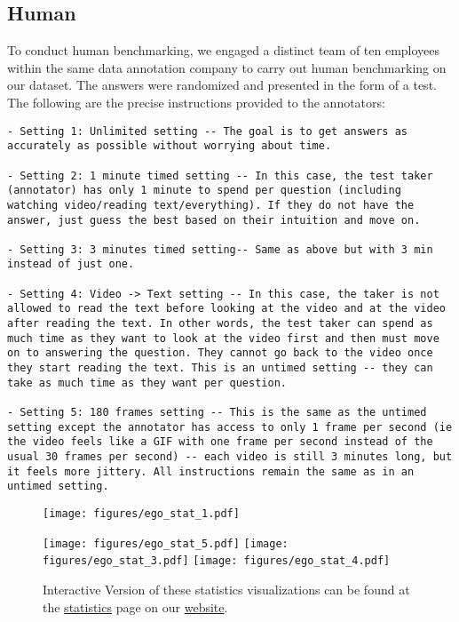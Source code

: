 \subsection{\textbf{Human}}
To conduct human benchmarking, we engaged a distinct team of ten employees within the same data annotation company to carry out human benchmarking on our dataset. The answers were randomized and presented in the form of a test. The following are the precise instructions provided to the annotators:
\begin{lstlisting}
- Setting 1: Unlimited setting -- The goal is to get answers as accurately as possible without worrying about time. 

- Setting 2: 1 minute timed setting -- In this case, the test taker (annotator) has only 1 minute to spend per question (including watching video/reading text/everything). If they do not have the answer, just guess the best based on their intuition and move on.

- Setting 3: 3 minutes timed setting-- Same as above but with 3 min instead of just one.

- Setting 4: Video -> Text setting -- In this case, the taker is not allowed to read the text before looking at the video and at the video after reading the text. In other words, the test taker can spend as much time as they want to look at the video first and then must move on to answering the question. They cannot go back to the video once they start reading the text. This is an untimed setting -- they can take as much time as they want per question. 

- Setting 5: 180 frames setting -- This is the same as the untimed setting except the annotator has access to only 1 frame per second (ie the video feels like a GIF with one frame per second instead of the usual 30 frames per second) -- each video is still 3 minutes long, but it feels more jittery. All instructions remain the same as in an untimed setting. 
\end{lstlisting}
\clearpage
\begin{figure}[h!]
\centering
\texttt{[image: figures/ego\_stat\_1.pdf]}

\texttt{[image: figures/ego\_stat\_5.pdf]}
\texttt{[image: figures/ego\_stat\_3.pdf]}
\texttt{[image: figures/ego\_stat\_4.pdf]}
\caption{Interactive Version of these statistics visualizations can be found at the \href{https://public.tableau.com/views/EgoSchema/EGOSchema?:showVizHome=no}{statistics} page on our \href{https://egoschema.github.io/}{website}.}

\end{figure}

